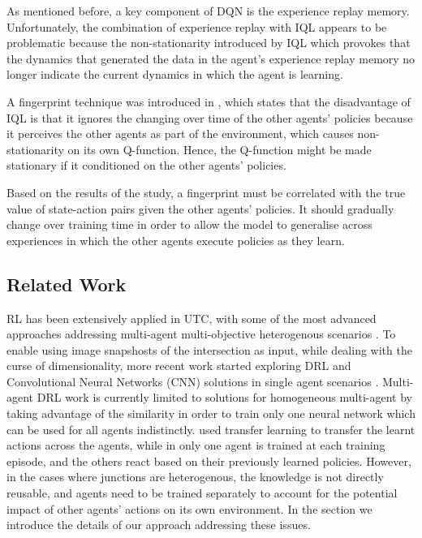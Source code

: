 \documentclass{llncs}
\begin{document}
As mentioned before, a key component of DQN is the experience replay memory.  Unfortunately, the combination of experience replay with IQL appears to be problematic because the non-stationarity introduced by IQL which provokes that the dynamics that generated the data in the agent's experience replay memory no longer indicate the current dynamics in which the agent is learning.

A fingerprint technique was introduced in \cite{Foerster2017}, which states that the disadvantage of IQL is that it ignores the changing over time of the other agents' policies because it perceives the other agents as part of the environment, which causes non-stationarity on its own Q-function. Hence, the Q-function might be made stationary if it conditioned on the other agents' policies.

Based on the results of the study, a fingerprint must be correlated with the true value of state-action pairs given the other agents' policies. It should gradually change over training time in order to allow the model to generalise across experiences in which the other agents execute policies as they learn.

\subsection{Related Work}

RL has been extensively applied in UTC, with some of the most advanced approaches addressing multi-agent multi-objective heterogenous scenarios \cite{Dusparic2016, El-Tantawy2012}. To enable using image snapshosts of the intersection as input, while dealing with the curse of dimensionality, more recent work started exploring DRL and Convolutional Neural Networks (CNN) solutions in single agent scenarios \cite{Mousavi2017,Liang2018}. Multi-agent DRL work is currently limited to solutions for homogeneous multi-agent by taking advantage of the similarity in order to train only one neural network which can be used for all agents indistinctly.\cite{VanDerPol2016} used transfer learning to transfer the learnt actions across the agents, while in \cite{Liu2017CooperativeDR} only one agent is trained at each training episode, and the others react based on their previously learned policies. However, in the cases where junctions are heterogenous, the knowledge is not directly reusable, and agents need to be trained separately to account for the potential impact of other agents' actions on its own environment. In the section we introduce the details of our approach addressing these issues. 
\end{document}
